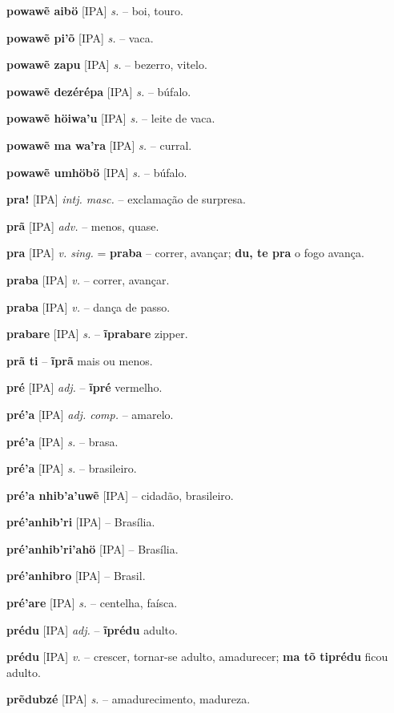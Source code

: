 \textbf{powawẽ aibö} [IPA] \textit{s.} -- boi, touro.

\textbf{powawẽ pi'õ} [IPA] \textit{s.} -- vaca.

\textbf{powawẽ zapu} [IPA] \textit{s.} -- bezerro, vitelo.

\textbf{powawẽ dezérépa} [IPA] \textit{s.} -- búfalo.

\textbf{powawẽ höiwa'u} [IPA] \textit{s.} -- leite de vaca.

\textbf{powawẽ ma wa'ra} [IPA] \textit{s.} -- curral.

\textbf{powawẽ umhöbö} [IPA] \textit{s.} -- búfalo.

\textbf{pra!} [IPA] \textit{intj. masc.} -- exclamação de surpresa.

\textbf{prã} [IPA] \textit{adv.} -- menos, quase.

\textbf{pra} [IPA] \textit{v. sing.} = \textbf{praba} -- correr, avançar; \textbf{du, te pra} o fogo avança.

\textbf{praba} [IPA] \textit{v.} -- correr, avançar.

\textbf{praba} [IPA] \textit{v.} -- dança de passo.

\textbf{prabare} [IPA] \textit{s.} -- \textbf{ĩprabare} zipper.

\textbf{prã ti} -- \textbf{ĩprã} mais ou menos.

\textbf{pré} [IPA] \textit{adj.} -- \textbf{ĩpré} vermelho.

\textbf{pré'a} [IPA] \textit{adj. comp.} -- amarelo.

\textbf{pré'a} [IPA] \textit{s.} -- brasa.

\textbf{pré'a} [IPA] \textit{s.} -- brasileiro.

\textbf{pré'a nhib'a'uwẽ} [IPA] \textit{} -- cidadão, brasileiro.

\textbf{pré'anhib'ri} [IPA] \textit{} -- Brasília.

\textbf{pré'anhib'ri'ahö} [IPA] \textit{} -- Brasília.

\textbf{pré'anhibro} [IPA] \textit{} -- Brasil.

\textbf{pré'are} [IPA] \textit{s.} -- centelha, faísca.

\textbf{prédu} [IPA] \textit{adj.} -- \textbf{ĩprédu} adulto.

\textbf{prédu} [IPA] \textit{v.} -- crescer, tornar-se adulto, amadurecer; \textbf{ma tõ tiprédu} ficou adulto.

\textbf{prẽdubzé} [IPA] \textit{s.} -- amadurecimento, madureza.

